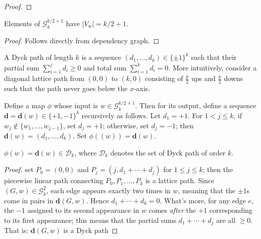 \begin{proof}
\end{proof}


\begin{lemma}
  \label{lem:special_g_vertex_count}
  Elements of $\mathcal{G}_k^{k/2+1}$ have $|V_w| = k/2 + 1$.
\end{lemma}

\begin{proof}
  Follows directly from dependency graph.
\end{proof}


\begin{definition}
  \notready
  \label{def:Dyck_paths}
  A Dyck path of length $k$ is a sequence $(d_1,...,d_k) \in \{\pm 1\}^k$ such that their partial sum $\sum_{i=1}^j d_i \geq 0$
  and total sum $\sum_{i = 1}^{k}d_i = 0$. More intuitively, consider a diagonal lattice path from $(0,0)$ to $(k, 0)$ consisting of
  $\frac{k}{2}$ ups and $\frac{k}{2}$ downs such that the path never goes below the $x$-axis.
\end{definition}


\begin{definition}
  \notready
  \label{def:graph_to_Dyck_map}
   Define a map $\phi$ whose input is $w \in \mathcal{G}^{k/2 + 1}_k$. Then for its output,
   define a sequence $\mathbf{d}=\mathbf{d}(w)\in\{+1,-1\}^k$ recursively as follows.
   Let $d_1=+1$.  For $1<j\le k$, if $w_j\notin\{w_1,\ldots,w_{j-1}\}$, set $d_j=+1$; otherwise, set $d_j=-1$; then
   $\mathbf{d}(w) = (d_1,\ldots,d_k)$. Set $\phi((w)) = \mathbf{d}(w)$.
\end{definition}


\begin{lemma}
  \notready
  \label{lem:graph_Dyck_correspondence}
  $\phi(w) = \mathbf{d}(w) \in \mathcal{D}_k$, where $\mathcal{D}_k$ denotes the set of Dyck path of order $k$.
\end{lemma}

\begin{proof}
  \notready
  set $P_0 = (0,0)$ and $P_j = (j,d_1+\cdots+d_j)$ for $1\le j\le k$; then the piecewise linear path
  connecting $P_0,P_1,\ldots,P_k$ is a lattice path.  Since $(G,w)\in\mathcal{G}_k^2$, each edge appears exactly two times in $w$,
  meaning that the $\pm1$s come in pairs in $\mathbf{d}(G,w)$.  Hence $d_1+\cdots+d_k=0$.  What's more, for any edge $e$,
  the $-1$ assigned to its second appearance in $w$ comes {\em after} the $+1$ corresponding to its first appearance;
  this means that the partial sums $d_1+\cdots+d_j$ are all $\ge 0$.  That is: $\mathbf{d}(G,w)$ is a Dyck path
\end{proof}


